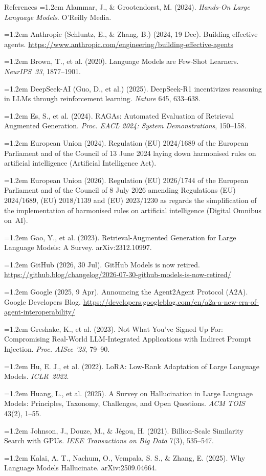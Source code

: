 \documentclass[aspectratio=169,11pt]{beamer}
\newcommand{\refitem}[1]{\hangindent=1.2em\hangafter=1 #1\par}
\begin{document}
\begin{frame}[allowframebreaks]{References}
  \footnotesize
  \setlength{\parskip}{0pt}
  \setlength{\parindent}{0pt}
  \refitem{Alammar, J., \& Grootendorst, M. (2024). \textit{Hands-On Large Language Models}. O'Reilly Media.}
  \refitem{Anthropic (Schluntz, E., \& Zhang, B.) (2024, 19 Dec). Building effective agents. \url{https://www.anthropic.com/engineering/building-effective-agents}}
  \refitem{Brown, T., et al. (2020). Language Models are Few-Shot Learners. \textit{NeurIPS~33}, 1877--1901.}
  \refitem{DeepSeek-AI (Guo, D., et al.) (2025). DeepSeek-R1 incentivizes reasoning in LLMs through reinforcement learning. \textit{Nature} 645, 633--638.}
  \refitem{Es, S., et al. (2024). RAGAs: Automated Evaluation of Retrieval Augmented Generation. \textit{Proc. EACL 2024: System Demonstrations}, 150--158.}
  \refitem{European Union (2024). Regulation (EU) 2024/1689 of the European Parliament and of the Council of 13 June 2024 laying down harmonised rules on artificial intelligence (Artificial Intelligence Act).}
  \refitem{European Union (2026). Regulation (EU) 2026/1744 of the European Parliament and of the Council of 8 July 2026 amending Regulations (EU) 2024/1689, (EU) 2018/1139 and (EU) 2023/1230 as regards the simplification of the implementation of harmonised rules on artificial intelligence (Digital Omnibus on~AI).}
  \refitem{Gao, Y., et al. (2023). Retrieval-Augmented Generation for Large Language Models: A Survey. arXiv:2312.10997.}
  \refitem{GitHub (2026, 30 Jul). GitHub Models is now retired. \url{https://github.blog/changelog/2026-07-30-github-models-is-now-retired/}}
  \refitem{Google (2025, 9 Apr). Announcing the Agent2Agent Protocol (A2A). Google Developers Blog. \url{https://developers.googleblog.com/en/a2a-a-new-era-of-agent-interoperability/}}
  \refitem{Greshake, K., et al. (2023). Not What You've Signed Up For: Compromising Real-World LLM-Integrated Applications with Indirect Prompt Injection. \textit{Proc. AISec '23}, 79--90.}
  \refitem{Hu, E. J., et al. (2022). LoRA: Low-Rank Adaptation of Large Language Models. \textit{ICLR~2022}.}
  \refitem{Huang, L., et al. (2025). A Survey on Hallucination in Large Language Models: Principles, Taxonomy, Challenges, and Open Questions. \textit{ACM TOIS} 43(2), 1--55.}
  \refitem{Johnson, J., Douze, M., \& J\'egou, H. (2021). Billion-Scale Similarity Search with GPUs. \textit{IEEE Transactions on Big Data} 7(3), 535--547.}
  \refitem{Kalai, A. T., Nachum, O., Vempala, S. S., \& Zhang, E. (2025). Why Language Models Hallucinate. arXiv:2509.04664.}

\end{frame}
\end{document}
